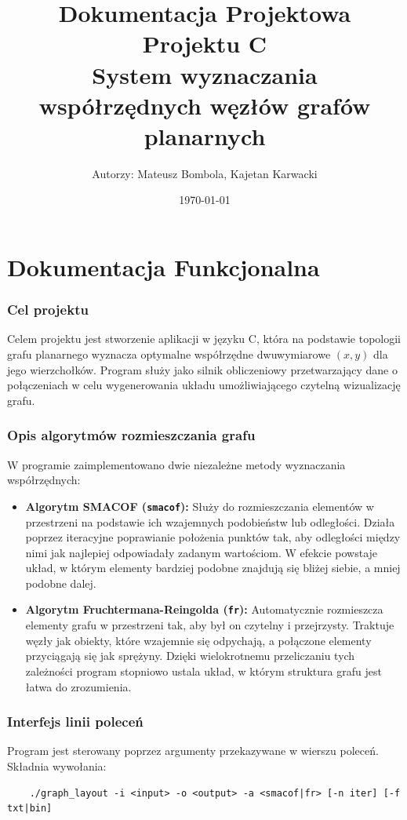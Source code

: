 \documentclass[12pt,a4paper]{article}
\title{Dokumentacja Projektowa Projektu C\\ \large System wyznaczania współrzędnych węzłów grafów planarnych}
\author{Autorzy: Mateusz Bombola, Kajetan Karwacki}
\date{\today}
\begin{document}
\maketitle
\newpage
\tableofcontents
\newpage

\part{Dokumentacja Funkcjonalna}

\section{Cel projektu}
Celem projektu jest stworzenie aplikacji w języku C, która na podstawie topologii grafu planarnego wyznacza optymalne współrzędne dwuwymiarowe $(x, y)$ dla jego wierzchołków. Program służy jako silnik obliczeniowy przetwarzający dane o połączeniach w celu wygenerowania układu umożliwiającego czytelną wizualizację grafu.

\section{Opis algorytmów rozmieszczania grafu}
W programie zaimplementowano dwie niezależne metody wyznaczania współrzędnych:

\begin{itemize}
    \item \textbf{Algorytm SMACOF (\texttt{smacof}):} Służy do rozmieszczania elementów w przestrzeni na podstawie ich wzajemnych podobieństw lub odległości. Działa poprzez iteracyjne poprawianie położenia punktów tak, aby odległości między nimi jak najlepiej odpowiadały zadanym wartościom. W efekcie powstaje układ, w którym elementy bardziej podobne znajdują się bliżej siebie, a mniej podobne dalej.
    
    \item \textbf{Algorytm Fruchtermana-Reingolda (\texttt{fr}):} Automatycznie rozmieszcza elementy grafu w przestrzeni tak, aby był on czytelny i przejrzysty. Traktuje węzły jak obiekty, które wzajemnie się odpychają, a połączone elementy przyciągają się jak sprężyny. Dzięki wielokrotnemu przeliczaniu tych zależności program stopniowo ustala układ, w którym struktura grafu jest łatwa do zrozumienia.
\end{itemize}

\section{Interfejs linii poleceń}
Program jest sterowany poprzez argumenty przekazywane w wierszu poleceń. Składnia wywołania:
\begin{center}
    \begin{verbatim}
    ./graph_layout -i <input> -o <output> -a <smacof|fr> [-n iter] [-f txt|bin]
    \end{verbatim}
\end{center}
\end{document}
